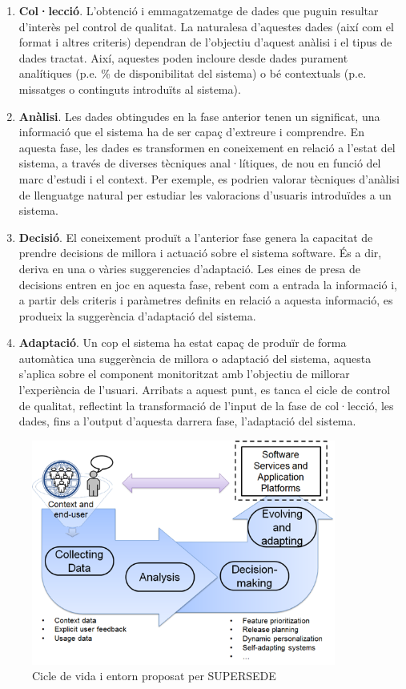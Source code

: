 \begin{enumerate}
\item \textbf{Col·lecció}. L'obtenció i emmagatzematge de dades que puguin resultar d'interès pel control de qualitat. La naturalesa d'aquestes dades (així com el format i altres criteris) dependran de l'objectiu d'aquest anàlisi i el tipus de dades tractat. Així, aquestes poden incloure desde dades purament analítiques (p.e. \% de disponibilitat del sistema) o bé contextuals (p.e. missatges o continguts introduïts al sistema).
\item \textbf{Anàlisi}. Les dades obtingudes en la fase anterior tenen un significat, una informació que el sistema ha de ser capaç d'extreure i comprendre. En aquesta fase, les dades es transformen en coneixement en relació a l'estat del sistema, a través de diverses tècniques anal·lítiques, de nou en funció del marc d'estudi i el context. Per exemple, es podrien valorar tècniques d'anàlisi de llenguatge natural per estudiar les valoracions d'usuaris introduïdes a un sistema.
\item \textbf{Decisió}. El coneixement produït a l'anterior fase genera la capacitat de prendre decisions de millora i actuació sobre el sistema software. És a dir, deriva en una o vàries suggerencies d'adaptació. Les eines de presa de decisions entren en joc en aquesta fase, rebent com a entrada la informació i, a partir dels criteris i paràmetres definits en relació a aquesta informació, es produeix la suggerència d'adaptació del sistema.
\item \textbf{Adaptació}. Un cop el sistema ha estat capaç de produïr de forma automàtica una suggerència de millora o adaptació del sistema, aquesta s'aplica sobre el component monitoritzat amb l'objectiu de millorar l'experiència de l'usuari. Arribats a aquest punt, es tanca el cicle de control de qualitat, reflectint la transformació de l'input de la fase de col·lecció, les dades, fins a l'output d'aquesta darrera fase, l'adaptació del sistema.
\end{enumerate}

\begin{figure}
\centering
\includegraphics[width=10cm]{Figures/Figure2}
\decoRule
\caption[Cicle de vida i entorn proposat per SUPERSEDE]{Cicle de vida i entorn proposat per SUPERSEDE}
\label{fig:Figura1}
\end{figure}

